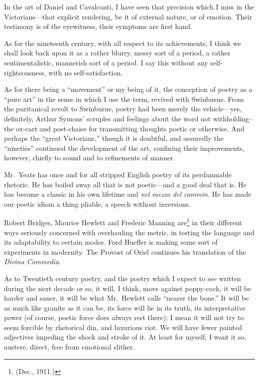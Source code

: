 In the art of Daniel and Cavalcanti, I have seen that precision which I
miss in the Victorians---that explicit rendering, be it of external
nature, or of emotion. Their testimony is of the eyewitness, their
symptoms are first hand.

As for the nineteenth century, with all respect to its achievements, I
think we shall look back upon it as a rather blurry, messy sort of a
period, a rather sentimentalistic, mannerish sort of a period. I say
this without any self-righteousness, with no self-satisfaction.

As for there being a ``movement'' or my being of it, the conception of
poetry as a ``pure art'' in the sense in which I use the term, revived
with Swinburne. From the puritanical revolt to Swinburne, poetry had
been merely the vehicle---yes, definitely, Arthur Symons' scruples and
feelings about the word not withholding--the ox-cart and post-chaise for
transmitting thoughts poetic or otherwise. And perhaps the ``great
Victorians,'' though it is doubtful, and assuredly the ``nineties''
continued the development of the art, confining their improvements,
however, chiefly to sound and to refinements of manner.

Mr.~Yeats has once and for all stripped English poetry of its
perdamnable rhetoric. He has boiled away all that is not poetic---and a
good deal that is. He has become a classic in his own lifetime and
\emph{nel mezzo del cammin}. He has made our poetic idiom a thing
pliable, a speech without inversions.

Robert Bridges, Maurice Hewlett and Frederic Manning are\footnote{(Dec.,
  1911.)} in their different ways seriously concerned with overhauling
the metric, in testing the language and its adaptability to certain
modes. Ford Hueffer is making some sort of experiments in modernity. The
Provost of Oriel continues his translation of the \emph{Divina
Commedia}.

As to Twentieth century poetry, and the poetry which I expect to see
written during the next decade or so, it will, I think, move against
poppy-cock, it will be harder and saner, it will be what Mr.~Hewlett
calls ``nearer the bone.'' It will be as much like granite as it can be,
its force will lie in its truth, its interpretative power (of course,
poetic force does always rest there); I mean it will not try to seem
forcible by rhetorical din, and luxurious riot. We will have fewer
painted adjectives impeding the shock and stroke of it. At least for
myself, I want it so, austere, direct, free from emotional slither.

